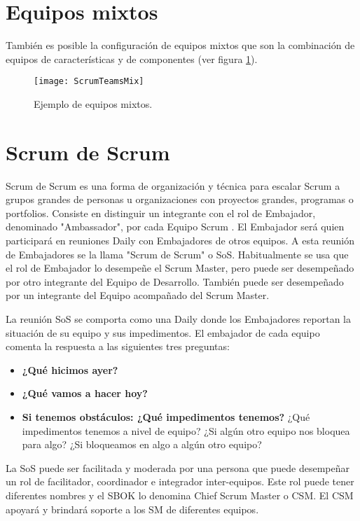 \section{Equipos mixtos}

También es posible la configuración de equipos mixtos que son la combinación de equipos de características y de componentes (ver figura \ref{fig:ScrumTeamsMix}).

\begin{figure}[h]
  \centering
  \texttt{[image: ScrumTeamsMix]}
  \caption{Ejemplo de equipos mixtos.}
  \centering
  \label{fig:ScrumTeamsMix} %
\end{figure}

\section{Scrum de Scrum}

Scrum de Scrum es una forma de organización y técnica para escalar Scrum a grupos grandes de personas u organizaciones con proyectos grandes, programas o portfolios. Consiste en distinguir un integrante con el rol de Embajador, denominado "Ambassador", por cada Equipo Scrum \cite{Stefanini-2013}. El Embajador será quien participará en reuniones Daily con Embajadores de otros equipos. A esta reunión de Embajadores se la llama "Scrum de Scrum" o SoS. Habitualmente se usa que el rol de Embajador lo desempeñe el Scrum Master, pero puede ser desempeñado por otro integrante del Equipo de Desarrollo. También puede ser desempeñado por un integrante del Equipo acompañado del Scrum Master.

La reunión SoS se comporta como una Daily donde los Embajadores reportan la situación de su equipo y sus impedimentos. El embajador de cada equipo comenta la respuesta a las siguientes tres preguntas:

\begin{itemize}
\item \textbf{¿Qué hicimos ayer?}
\item \textbf{¿Qué vamos a hacer hoy?}
\item \textbf{Si tenemos obstáculos: ¿Qué impedimentos tenemos?} ¿Qué impedimentos tenemos a nivel de equipo? ¿Si algún otro equipo nos bloquea para algo? ¿Si bloqueamos en algo a algún otro equipo?
\end{itemize}

La SoS puede ser facilitada y moderada por una persona que puede desempeñar un rol de facilitador, coordinador e integrador inter-equipos. Este rol puede tener diferentes nombres y el SBOK lo denomina Chief Scrum Master o CSM. El CSM apoyará y brindará soporte a los SM de diferentes equipos.

